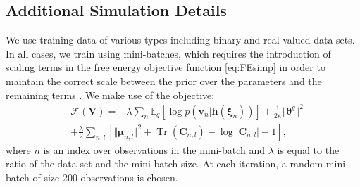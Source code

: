 \documentclass{article}
\newcommand{\E}{\mathbb{E}} %
\newcommand{\FE}{\mathcal{F}} %
\DeclareMathOperator{\Tr}{Tr} %
\newcommand{\hid}{\ensuremath{\mathbf{h}}} %
\newcommand{\vis}{\ensuremath{\mathbf{v}}} %
\newcommand{\myvec}[1]{\mbox{$\mathbf{#1}$}}
\newcommand{\myvecsym}[1]{\mbox{$\boldsymbol{#1}$}}
\newcommand{\vmu}{\mbox{$\myvecsym{\mu}$}}
\newcommand{\vtheta}{\mbox{$\myvecsym{\theta}$}}
\newcommand{\vxi}{\mbox{$\myvecsym{\xi}$}}
\newcommand{\vC}{\mbox{$\myvec{C}$}}
\newcommand{\vV}{\mbox{$\myvec{V}$}}
\begin{document}
\begin{bibunit}[icml2013]
\section{Additional Simulation Details}
We use training data of various types including binary and real-valued 
data sets. In all cases, we train using mini-batches, which requires the 
introduction of scaling terms in the free energy objective function 
\eqref{eq:FEsimp} in order to maintain the correct scale between the 
prior over the parameters and the remaining terms  
\citep{conf/icml/AhnBW12, 
ICML2011Welling_398}. We make use of the objective: 
\begin{align}
& \overline{\FE(\vV)} = -\lambda \sum_n
\E_{q} \left[ \log p(\vis_n| \hid(\vxi_n) ) \right]  
 + \tfrac{1}{2 \kappa} \Vert \vtheta^g\Vert ^2 \nonumber \\
&+  \frac{\lambda}{2} \sum_{n,l} \left[ \Vert \vmu_{n,l} \Vert ^2 + 
\Tr(\vC _{n,l})  - \log \vert \vC_{n,l} \vert - 1 \right], 
\label{eq:FEsimpMiniBatch}
\end{align}
where $n$ is an index over observations in the mini-batch and $\lambda$ is 
equal to the ratio of the data-set and the mini-batch size. At each iteration, a 
random mini-batch of size 200 observations is chosen.


\end{bibunit}
\end{document}

